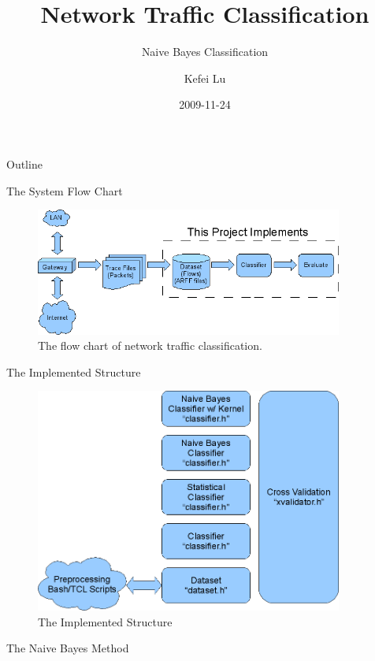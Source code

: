 \documentclass{beamer}
\title[Network Traffic Classification] %
{Network Traffic Classification}
\subtitle
{Naive Bayes Classification}
\author %
{Kefei Lu}
\institute[Universities of Miami] %
{
  Department of Electrical and Computer Engineering\\
  University of Miami}
\date[] %
{2009-11-24}
\begin{document}
\begin{frame}
  \titlepage
\end{frame}

\begin{frame}{Outline}
  \tableofcontents
\end{frame}

\begin{frame}{The System Flow Chart}
	\begin{figure}[tbp]
	    \centering
	    \includegraphics[width=0.9\textwidth]{pic/flow_chart.png}
	    \caption{The flow chart of network traffic classification.}
	    \label{fig:flow_chart}
	\end{figure}
\end{frame}

\begin{frame}{The Implemented Structure}
	\begin{figure}[tbp]
	    \centering
	    \includegraphics[width=0.9\textwidth]{pic/struct.png}
	    \caption{The Implemented Structure}
	    \label{fig:flow_chart}
	\end{figure}
\end{frame}

\begin{frame}{The Naive Bayes Method}

\end{frame}

\begin{frame}
\end{frame}

\begin{frame}
\end{frame}
\end{document}
